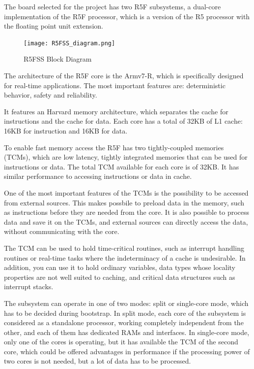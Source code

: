 The board selected for the project has two R5F subsystems, a dual-core
implementation of the R5F processor, which is a version of the R5 processor
with the floating point unit extension.

\begin{figure}[H]
    \centering
    \texttt{[image: R5FSS\_diagram.png]}
    \caption{R5FSS Block Diagram}
\end{figure}

The architecture of the R5F core is the Armv7-R, which is specifically designed
for real-time applications.
The most important features are: deterministic behavior, safety and
reliability.

It features an Harvard memory architecture, which separates the cache for
instructions and the cache for data.
Each core has a total of 32KB of L1 cache: 16KB for instruction and 16KB for
data.

To enable fast memory access the R5F has two tightly-coupled memories (TCMs),
which are low latency, tightly integrated memories that can be used for
instructions or data. The total TCM available for each core is of 32KB.
It has similar performance to accessing instructions or data in cache.
\cite{Technical_reference_AM64}

One of the most important features of the TCMs is the possibility to be
accessed from external sources. This makes possbile to preload data in the
memory, such as instructions before they are needed from the core.
It is also possible to process data and save it on the TCMs, and external
sources can directly access the data, without communicating with the core.

The TCM can be used to hold time-critical routines, such as interrupt
handling routines or real-time tasks where the indeterminacy of a cache is
undesirable. In addition, you can use it to hold ordinary variables, data types
whose locality properties are not well suited to caching, and critical data
structures such as interrupt stacks. \cite{TCM_documentation}

The subsystem can operate in one of two modes: split or single-core mode, which
has to be decided during bootstrap.
In split mode, each core of the subsystem is considered as a standalone
processor, working completely independent from the other, and each of them has
dedicated RAMs and interfaces.
In single-core mode, only one of the cores is operating, but it has available
the TCM of the second core, which could be offered advantages in performance if
the processing power of two cores is not needed, but a lot of data has to be
processed. 

